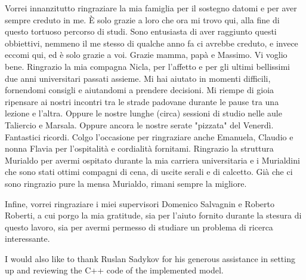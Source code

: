\vspace{1.0cm}
{
	\setlength\parindent{0pt}

	Vorrei innanzitutto ringraziare la mia famiglia per il sostegno datomi e per aver sempre creduto in me.
	È solo grazie a loro che ora mi trovo qui, alla fine di questo tortuoso percorso di studi.
	Sono entusiasta di aver raggiunto questi obbiettivi, nemmeno il me stesso di qualche anno fa ci avrebbe creduto,
	e invece eccomi qui, ed è solo grazie a voi.
	Grazie mamma, papà e Massimo.
	Vi voglio bene.
	Ringrazio la mia compagna Nicla, per l'affetto e per gli ultimi bellissimi due anni universitari passati assieme.
	Mi hai aiutato in momenti difficili, fornendomi consigli e aiutandomi a prendere decisioni.
	Mi riempe di gioia ripensare ai nostri incontri tra le strade padovane durante le pause tra una lezione e l'altra.
	Oppure le nostre lunghe (circa) sessioni di studio nelle aule Taliercio e Marsala.
	Oppure ancora le nostre serate "pizzata" del Venerdì.
	Fantastici ricordi.
	Colgo l'occasione per ringraziare anche Emanuela, Claudio e nonna Flavia per l'ospitalità
	e cordialità fornitami.
	Ringrazio la struttura Murialdo per avermi ospitato durante la mia carriera universitaria e
	i Murialdini che sono stati ottimi compagni di cena, di uscite serali e di calcetto.
	Già che ci sono ringrazio pure la mensa Murialdo, rimani sempre la migliore.

	\medskip

	Infine, vorrei ringraziare i miei supervisori Domenico Salvagnin e Roberto Roberti,
	a cui porgo la mia gratitude, sia per l'aiuto fornito durante la stesura di questo lavoro,
	sia per avermi permesso di studiare un problema di ricerca interessante.

	I would also like to thank Ruslan Sadykov for his generous assistance in setting up \bapcod{} and reviewing the C++ code of the implemented model.

}


\vspace{1cm}

{
	\setlength\parindent{0pt}

	\textit{\UnivPlace}\\
	\textit{\GraduationDate}    \hfill    \AuthorName{} \AuthorSurname{}
}

